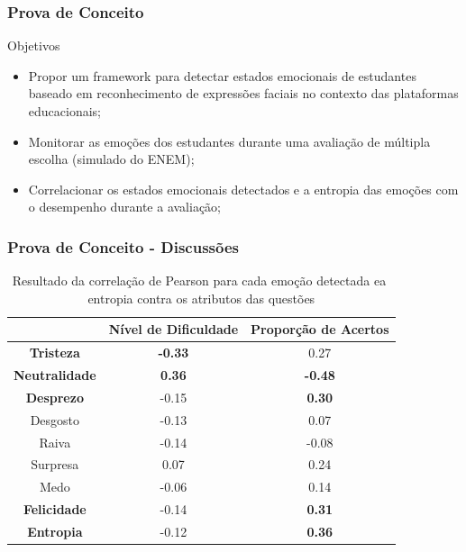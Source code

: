 \documentclass{beamer}
\begin{document}
\begin{frame}
 \frametitle{Prova de Conceito}
 \begin{block}{Objetivos}
\begin{itemize}
\pause
\item Propor um framework para detectar estados emocionais de estudantes baseado em reconhecimento de expressões faciais no contexto das plataformas educacionais;
\pause
\item Monitorar as emoções dos estudantes durante uma avaliação de múltipla escolha (simulado do ENEM);
\pause
\item Correlacionar os estados emocionais detectados e a entropia das emoções com o desempenho durante a avaliação;
\end{itemize}
\end{block}
\end{frame}


\begin{frame}
\frametitle{Prova de Conceito - Discussões}
\begin{table}[]\footnotesize
\centering
\caption{Resultado​ ​da​ ​correla\c{c}\~ao​ ​de​ ​Pearson​ ​para​ ​cada​ ​emo\c{c}\~ao​ ​detectada
e​ ​a​ ​entropia​ ​contra​ ​os​ ​atributos​ ​das​ ​quest\~oes}
\label{my-label}
\begin{tabular}{|c|c|c|}
\hline
                      & \textbf{Nível de Dificuldade} & \textbf{Proporção de Acertos} \\ \hline
\textbf{Tristeza}     & \textbf{-0.33}                & 0.27                          \\ \hline
\textbf{Neutralidade} & \textbf{0.36}                 & \textbf{-0.48}                \\ \hline
\textbf{Desprezo}     & -0.15                         & \textbf{0.30}                 \\ \hline
Desgosto              & -0.13                         & 0.07                          \\ \hline
Raiva                 & -0.14                         & -0.08                         \\ \hline
Surpresa              & 0.07                          & 0.24                          \\ \hline
Medo                  & -0.06                         & 0.14                          \\ \hline
\textbf{Felicidade}   & -0.14                         & \textbf{0.31}                 \\ \hline
\textbf{Entropia}     & -0.12                         & \textbf{0.36}                 \\ \hline
\end{tabular}
\end{table}
\end{frame}
\end{document}
